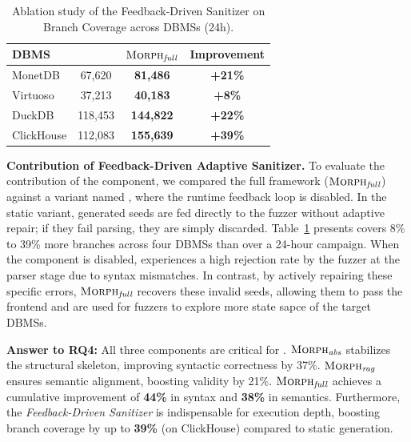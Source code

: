 \documentclass[sigconf,review,anonymous]{acmart}
\begin{document}
\begin{table}[b]
\centering
\small
\caption{Ablation study of the Feedback-Driven Sanitizer on Branch Coverage across DBMSs (24h).}
\label{tab:ablation_sanitizer}
\begin{tabular}{lccc}
\toprule
\textbf{DBMS} & \tooldisfuzzer{} & $\textsc{Morph}{}_{\textit{full}}$ & \textbf{Improvement} \\
\midrule
MonetDB    & 67,620 & \textbf{81,486}  & \textbf{+21\%} \\
Virtuoso   & 37,213 & \textbf{40,183}  & \textbf{+8\%} \\
DuckDB     & 118,453 & \textbf{144,822} & \textbf{+22\%} \\
ClickHouse & 112,083 & \textbf{155,639} & \textbf{+39\%} \\
\bottomrule
\end{tabular}
\end{table}

\textbf{Contribution of Feedback-Driven Adaptive Sanitizer.}
To evaluate the contribution of the component, we compared the full framework ($\textsc{Morph}{}_{\textit{full}}$) against a variant named \tooldisfuzzer{}, where the runtime feedback loop is disabled. In the static variant, generated seeds are fed directly to the fuzzer without adaptive repair; if they fail parsing, they are simply discarded.
Table~\ref{tab:ablation_sanitizer} presents \tool{} covers 8\% to 39\% more branches across four DBMSs than \tooldisfuzzer{} over a 24-hour campaign. 
When the component is disabled, \tooldisfuzzer{} experiences a high rejection rate by the fuzzer at the parser stage due to syntax mismatches.
In contrast, by actively repairing these specific errors, $\textsc{Morph}{}_{\textit{full}}$ recovers these invalid seeds, allowing them to pass the frontend and are used for fuzzers to explore more state sapce of the target DBMSs. 

\begin{answerbox}
\textbf{Answer to RQ4:} All three components are critical for \tool{}. $\textsc{Morph}{}_{\textit{abs}}$ stabilizes the structural skeleton, improving syntactic correctness by 37\%. $\textsc{Morph}{}_{\textit{rag}}$ ensures semantic alignment, boosting validity by 21\%. $\textsc{Morph}{}_{\textit{full}}$ achieves a cumulative improvement of \textbf{44\%} in syntax and \textbf{38\%} in semantics. 
Furthermore, the \textit{Feedback-Driven Sanitizer} is indispensable for execution depth, boosting branch coverage by up to \textbf{39\%} (on ClickHouse) compared to static generation.
\end{answerbox}
\end{document}
